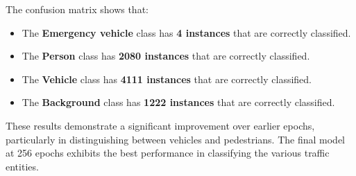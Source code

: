 \documentclass[conference]{IEEEtran}
\begin{document}
The confusion matrix shows  that:
\begin{itemize}
    \item The \textbf{Emergency vehicle} class has \textbf{4 instances} that are correctly classified.
    \item The \textbf{Person} class has \textbf{2080 instances} that are correctly classified.
    \item The \textbf{Vehicle} class has \textbf{4111 instances} that are correctly classified.
    \item The \textbf{Background} class has \textbf{1222 instances} that are correctly classified.
\end{itemize}

These results demonstrate a significant improvement over earlier epochs, particularly in distinguishing between vehicles and pedestrians. The final model at 256 epochs exhibits the best performance in classifying the various traffic entities.
\end{document}
